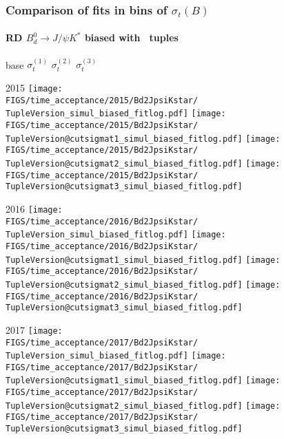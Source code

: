\begin{frame} %
\frametitle{Comparison of fits in bins of $\sigma_t(B)$}
\framesubtitle{RD $B_d^0\rightarrow J/\psi K^*$ biased with \TupleVersion\, tuples}

  \phantom{2020} base \hspace*{1.5cm} $\sigma_t^{(1)}$ \hspace*{1.5cm} $\sigma_t^{(2)}$ \hspace*{1.5cm} $\sigma_t^{(3)}$

  2015
  \texttt{[image: \\FIGS/time\_acceptance/2015/Bd2JpsiKstar/\\TupleVersion\_simul\_biased\_fitlog.pdf]}
  \texttt{[image: \\FIGS/time\_acceptance/2015/Bd2JpsiKstar/\\TupleVersion@cutsigmat1\_simul\_biased\_fitlog.pdf]}
  \texttt{[image: \\FIGS/time\_acceptance/2015/Bd2JpsiKstar/\\TupleVersion@cutsigmat2\_simul\_biased\_fitlog.pdf]}
  \texttt{[image: \\FIGS/time\_acceptance/2015/Bd2JpsiKstar/\\TupleVersion@cutsigmat3\_simul\_biased\_fitlog.pdf]}
  \vspace*{2mm}

  2016
  \texttt{[image: \\FIGS/time\_acceptance/2016/Bd2JpsiKstar/\\TupleVersion\_simul\_biased\_fitlog.pdf]}
  \texttt{[image: \\FIGS/time\_acceptance/2016/Bd2JpsiKstar/\\TupleVersion@cutsigmat1\_simul\_biased\_fitlog.pdf]}
  \texttt{[image: \\FIGS/time\_acceptance/2016/Bd2JpsiKstar/\\TupleVersion@cutsigmat2\_simul\_biased\_fitlog.pdf]}
  \texttt{[image: \\FIGS/time\_acceptance/2016/Bd2JpsiKstar/\\TupleVersion@cutsigmat3\_simul\_biased\_fitlog.pdf]}
  \vspace*{2mm}

  2017
  \texttt{[image: \\FIGS/time\_acceptance/2017/Bd2JpsiKstar/\\TupleVersion\_simul\_biased\_fitlog.pdf]}
  \texttt{[image: \\FIGS/time\_acceptance/2017/Bd2JpsiKstar/\\TupleVersion@cutsigmat1\_simul\_biased\_fitlog.pdf]}
  \texttt{[image: \\FIGS/time\_acceptance/2017/Bd2JpsiKstar/\\TupleVersion@cutsigmat2\_simul\_biased\_fitlog.pdf]}
  \texttt{[image: \\FIGS/time\_acceptance/2017/Bd2JpsiKstar/\\TupleVersion@cutsigmat3\_simul\_biased\_fitlog.pdf]}
  \vspace*{2mm}


\end{frame}

